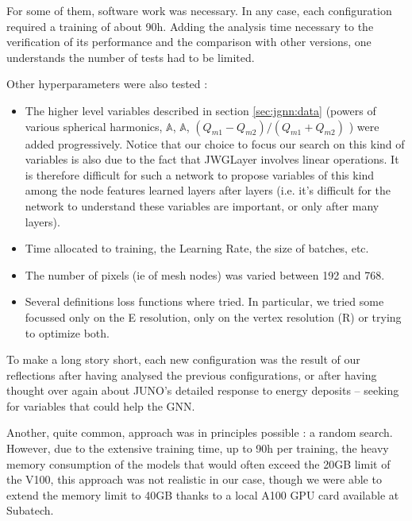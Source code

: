 \documentclass[../main.tex]{subfiles}
\begin{document}
\hfill

For some of them, software work was necessary. In any case, each configuration required a training of about 90h. Adding the analysis time necessary to the verification of its performance and the comparison with other versions, one understands the number of tests had to be limited.

Other hyperparameters were also tested :

\begin{itemize}

  \item The higher level variables described in section \ref{sec:jgnn:data} (powers of various spherical harmonics, $\mathbb{A}$, $\mathbb{A}$, $(Q_{m1}-Q_{m2})/(Q_{m1}+Q_{m2})$ ) were added progressively. Notice that our choice to focus our search on this kind of variables is also due to the fact that JWGLayer involves linear operations. It is therefore difficult for such a network to propose variables of this kind among the node features learned layers after layers (i.e. it's difficult for the network to understand these variables are important, or only after many layers).


  \item Time allocated to training, the Learning Rate, the size of
    batches, etc.

  \item The number of pixels (ie of mesh nodes) was varied between 192 and 768.

  \item Several definitions  loss functions where tried. In particular, we tried some focussed only on the E resolution, only on the vertex resolution (R) or trying to optimize both.
\end{itemize}

\hfill

To make a long story short, each new configuration was the result of our reflections after having analysed the previous configurations, or  after having thought over again about JUNO's detailed response to energy deposits -- seeking for variables that could help the GNN.

Another, quite common, approach  was in principles possible : a random search. However, due to the extensive training time, up to 90h per training, the heavy memory consumption of the models that would often exceed the 20GB limit of the V100, this approach was not realistic in our case, though we were able to extend the memory limit to 40GB thanks to a local A100 GPU card available at Subatech.
\end{document}
